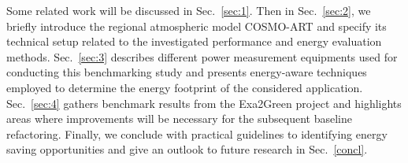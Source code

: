 Some  related work  will  be discussed  in  Sec.~\ref{sec:1}. Then  in
Sec.~\ref{sec:2}, we briefly  introduce the regional atmospheric model
COSMO-ART and specify its  technical setup related to the investigated
performance and energy evaluation methods.  Sec.~\ref{sec:3} describes
different  power  measurement  equipments  used  for  conducting  this
benchmarking  study and presents  energy-aware techniques  employed to
determine  the   energy  footprint  of   the  considered  application.
Sec.~\ref{sec:4} gathers benchmark  results from the Exa2Green project
and  highlights areas  where improvements  will be  necessary  for the
subsequent baseline refactoring.   Finally, we conclude with practical
guidelines  to identifying  energy  saving opportunities  and give  an
outlook to future research in Sec.~\ref{concl}.

